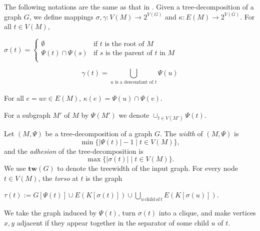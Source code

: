 \documentclass[11pt]{article}
\newcommand{\tw}{{\mathbf{tw}}}
\begin{document}
\noindent
The following notations are the same as that in \cite{GroheM12}. Given a tree-decomposition of a graph 
$G$, 
we define mappings $\sigma, \gamma :V(M)\rightarrow2^{V(G)}$  and $\kappa: E(M) \rightarrow 2^{V(G)}$. 
 For all $t\in V(M)$,\\
\begin{center}
$
\sigma(t) = \begin{cases}

  \emptyset & \text{if $t$ is the root of $M$} \\

  \Psi(t)\cap \Psi(s) & \text{if $s$ is the parent of $t$ in $M$} \\

\end{cases}
$\end{center}

$$\gamma(t)=\bigcup_{u \text { is a descendant of } t}\Psi(u)$$\\



For all $e=uv \in E(M)$, $\kappa(e)=\Psi(u)\cap \Psi(v)$. 

For a subgraph $M'$ of $M$ by $\Psi(M')$ we denote $\cup_{t\in V(M')}\Psi(t)$. 
\medskip
\noindent



Let $(M,\Psi)$ be a tree-decomposition of a graph $G$. The {\em width} of $(M,\Psi)$ is 
$$\min\Big\{\vert \Psi(t)\vert -1 \mid t\in V(M)\Big\},$$ and the {\em adhesion}  of the tree-decomposition is 
$$\max\Big\{\vert \sigma(t)\vert \mid t\in V(M)\Big\}.$$ 
We use $\tw(G)$ to denote the treewidth of the input graph. For every node $t\in V(M)$, the {\em torso} at $t$ is the graph 

\begin{center}
$\tau(t):= G[\Psi(t)] \cup E(K[\sigma(t)]) \cup \bigcup_{u\, \mathrm{ child}\, \mathrm{of }\, t} E(K[\sigma(u)])$.
\end{center}

We take the graph induced by $\Psi(t)$, turn $\sigma(t)$ into a clique, and make vertices $x,y$ adjacent if they appear together in the separator  of some child $u$ of $t$.
\end{document}
